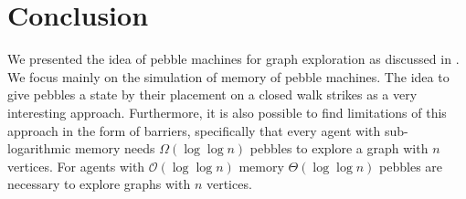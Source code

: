 \documentclass[oneside]{scrartcl}
\begin{document}
\section{Conclusion}
We presented the idea of pebble machines for graph exploration
as discussed in \cite{pebbles}. We focus mainly on the simulation of
memory of pebble machines. The idea to give pebbles a state by their placement
on a closed walk strikes as a very interesting approach. Furthermore, it is
also possible to find limitations of this approach in the form of barriers,
specifically that every agent with sub-logarithmic memory needs
$\Omega(\log\log n)$ pebbles to explore a graph with $n$ vertices. For agents
with $\mathcal{O}(\log\log n)$ memory $\Theta(\log\log n)$ pebbles are
necessary to explore graphs with $n$ vertices.

\printbibliography
\end{document}
